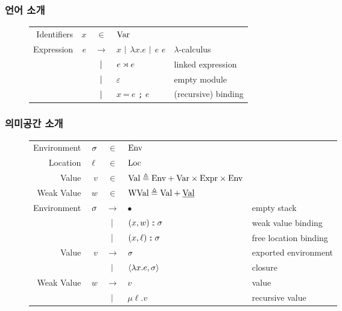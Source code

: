 \documentclass{beamer}
\begin{document}
\begin{frame}[c,fragile]
	\frametitle{언어 소개}
	\begin{figure}
		\small
		\begin{tabular}{rrcll}
			Identifiers & $x$ & $\in$         & $\text{Var}$                                                      \\
			Expression  & $e$ & $\rightarrow$ & $x$ $|$ $\lambda x.e$ $|$ $e$ $e$ & $\lambda$-calculus  \\
			            &     & $|$       & $e\rtimes e$                             & linked expression   \\
			            &     & $|$       & $\varepsilon$                             & empty module        \\
			            &     & $|$       & $x\:\texttt{=}\:e$ \texttt{;} $e$         & (recursive) binding
		\end{tabular}
	\end{figure}
\end{frame}
\begin{frame}[c,fragile]
	\frametitle{의미공간 소개}
	\begin{figure}
		\small
		\begin{tabular}{rrcll}
			Environment & $\sigma$ & $\in$         & $\text{Env}$                                                                        \\
			Location    & $\ell$ & $\in$         & $\text{Loc}$                                                                        \\
			Value       & $v$    & $\in$         & $\text{Val} \triangleq\text{Env}+\text{Var}\times\text{Expr}\times\text{Env}$                         \\
			Weak Value  & $w$    & $\in$         & $\text{WVal}\triangleq\text{Val}+\underline{\text{Val}}$                                     \\
			Environment & $\sigma$ & $\rightarrow$ & $\bullet$                                             & empty stack           \\
			            &        & $|$       & $(x,w):\mkern-3mu: \sigma$                                     & weak value binding    \\
			            &        & $|$       & $(x,\ell):\mkern-3mu:\sigma$                                   & free location binding \\
			Value       & $v$    & $\rightarrow$ & $\sigma$                                                & exported environment  \\
			            &        & $|$       & $\langle \lambda x.e, \sigma \rangle$                   & closure               \\
			Weak Value  & $w$    & $\rightarrow$ & $v$                                                   & value                 \\
			            &        & $|$       & $\mu\ell.v$                                           & recursive value
		\end{tabular}
	\end{figure}
\end{frame}
\end{document}
